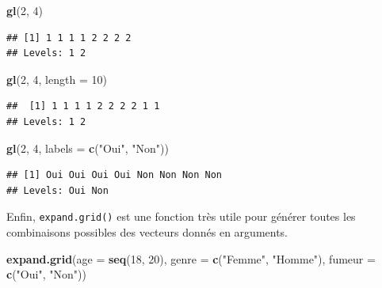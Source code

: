 \documentclass[
  11pt,
]{book}
\newenvironment{Shaded}{\begin{snugshade}}{\end{snugshade}}
\newcommand{\DataTypeTok}[1]{\textcolor[rgb]{0.13,0.29,0.53}{#1}}
\newcommand{\DecValTok}[1]{\textcolor[rgb]{0.00,0.00,0.81}{#1}}
\newcommand{\KeywordTok}[1]{\textcolor[rgb]{0.13,0.29,0.53}{\textbf{#1}}}
\newcommand{\NormalTok}[1]{#1}
\newcommand{\StringTok}[1]{\textcolor[rgb]{0.31,0.60,0.02}{#1}}
\numberwithin{equation}{section}
\numberwithin{countremarque}{section}
\begin{document}
\begin{Shaded}
\begin{Highlighting}[]
\KeywordTok{gl}\NormalTok{(}\DecValTok{2}\NormalTok{, }\DecValTok{4}\NormalTok{)}
\end{Highlighting}
\end{Shaded}

\begin{lstlisting}
## [1] 1 1 1 1 2 2 2 2
## Levels: 1 2
\end{lstlisting}

\begin{Shaded}
\begin{Highlighting}[]
\KeywordTok{gl}\NormalTok{(}\DecValTok{2}\NormalTok{, }\DecValTok{4}\NormalTok{, }\DataTypeTok{length =} \DecValTok{10}\NormalTok{)}
\end{Highlighting}
\end{Shaded}

\begin{lstlisting}
##  [1] 1 1 1 1 2 2 2 2 1 1
## Levels: 1 2
\end{lstlisting}

\begin{Shaded}
\begin{Highlighting}[]
\KeywordTok{gl}\NormalTok{(}\DecValTok{2}\NormalTok{, }\DecValTok{4}\NormalTok{, }\DataTypeTok{labels =} \KeywordTok{c}\NormalTok{(}\StringTok{"Oui"}\NormalTok{, }\StringTok{"Non"}\NormalTok{))}
\end{Highlighting}
\end{Shaded}

\begin{lstlisting}
## [1] Oui Oui Oui Oui Non Non Non Non
## Levels: Oui Non
\end{lstlisting}

Enfin, \texttt{expand.grid()} est une fonction très utile pour générer toutes les combinaisons possibles des vecteurs donnés en arguments.

\begin{Shaded}
\begin{Highlighting}[]
\KeywordTok{expand.grid}\NormalTok{(}\DataTypeTok{age =} \KeywordTok{seq}\NormalTok{(}\DecValTok{18}\NormalTok{, }\DecValTok{20}\NormalTok{), }\DataTypeTok{genre =} \KeywordTok{c}\NormalTok{(}\StringTok{"Femme"}\NormalTok{, }\StringTok{"Homme"}\NormalTok{), }\DataTypeTok{fumeur =} \KeywordTok{c}\NormalTok{(}\StringTok{"Oui"}\NormalTok{, }\StringTok{"Non"}\NormalTok{))}
\end{Highlighting}
\end{Shaded}
\end{document}
